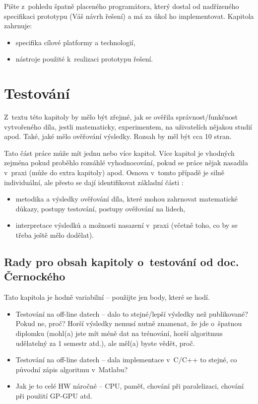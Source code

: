 Pište z~pohledu špatně placeného programátora, který dostal od nadřízeného specifikaci prototypu (Váš návrh řešení) a má za úkol ho implementovat. Kapitola zahrnuje:
\begin{itemize}
  \item{specifika cílové platformy a technologií,}
  \item{nástroje použité k~realizaci prototypu řešení.}
\end{itemize}


\section{Testování}
\label{testovani}

Z~textu této kapitoly by mělo být zřejmé, jak se ověřila správnost/funkčnost vytvořeného díla, jestli matematicky, experimentem, na uživatelích nějakou studií apod. Také, jaké mělo ověřování výsledky. Rozsah by měl být cca 10 stran.

Tato část práce může mít jednu nebo více kapitol. Více kapitol je vhodných zejména pokud proběhlo rozsáhlé vyhodnocování, pokud se práce nějak nasadila v~praxi (může do extra kapitoly) apod. Osnova v~tomto případě je silně individuální, ale přesto se dají identifikovat základní části \cite{Zemcik}: 
\begin{itemize}
  \item{metodika a výsledky ověřování díla, které mohou zahrnovat matematické důkazy, postupy testování, postupy ověřování na lidech,}
  \item{interpretace výsledků a možnosti nasazení v~praxi (včetně toho, co by se třeba ještě mělo dodělat).}
\end{itemize}

\subsection*{Rady pro obsah kapitoly o~testování od doc. Černockého}

Tato kapitola je hodně variabilní -- použijte jen body, které se hodí.
\begin{itemize}
  \item{Testování na off-line datech -- dalo to stejné/lepší výsledky než publikované? Pokud ne, proč? Horší výsledky nemusí nutně znamenat, že jde o~špatnou diplomku (mohl(a) jste mít méně dat na trénování, horší algoritmus udělatelný za 1 semestr atd.), ale měl(a) byste vědět, proč.}
  \item{Testování na off-line datech -- dala implementace v~C/C++ to stejné, co původní zápis algoritmu v~Matlabu?}
  \item{Jak je to celé HW náročné -- CPU, paměť, chování při paralelizaci, chování při použití GP-GPU atd.}
\end{itemize}

